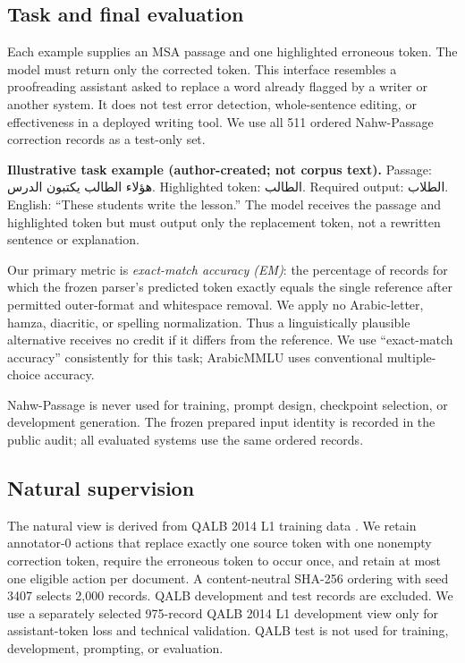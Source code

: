 \documentclass[11pt,a4paper]{article}
\newcommand{\textarabic}[1]{{\arabicfont\beginR#1\endR}}
\begin{document}
\subsection{Task and final evaluation}

Each example supplies an MSA passage and one highlighted erroneous token.  The
model must return only the corrected token.  This interface resembles a
proofreading assistant asked to replace a word already flagged by a writer or
another system.  It does not test error detection, whole-sentence editing,
or effectiveness in a deployed writing tool.  We use all 511 ordered
Nahw-Passage correction records as a test-only set.

\noindent\textbf{Illustrative task example (author-created; not corpus text).}
Passage: \textarabic{هؤلاء الطالب يكتبون الدرس.}  Highlighted token:
\textarabic{الطالب}.  Required output: \textarabic{الطلاب}.  English:
``These students write the lesson.''  The model receives the passage and
highlighted token but must output only the replacement token, not a rewritten
sentence or explanation.

Our primary metric is \emph{exact-match accuracy (EM)}: the percentage of
records for which the frozen parser's predicted token exactly equals the
single reference after permitted outer-format and whitespace removal.  We
apply no Arabic-letter, hamza, diacritic, or spelling normalization.  Thus a
linguistically plausible alternative receives no credit if it differs from
the reference.  We use ``exact-match accuracy'' consistently for this task;
ArabicMMLU uses conventional multiple-choice accuracy.

Nahw-Passage is never used for training, prompt design, checkpoint
selection, or development generation.  The frozen prepared input identity is
recorded in the public audit; all evaluated systems use the same
ordered records.

\subsection{Natural supervision}

The natural view is derived from QALB 2014 L1 training data
\citep{mohit-etal-2014-first}.  We retain annotator-0 actions that replace
exactly one source token with one nonempty correction token, require the
erroneous token to occur once, and retain at most one eligible action per
document.  A content-neutral SHA-256 ordering with seed 3407 selects 2,000
records.  QALB development and test records are excluded.  We use a separately
selected 975-record QALB 2014 L1 development view only for assistant-token
loss and technical validation.  QALB test is not used for training,
development, prompting, or evaluation.
\end{document}
